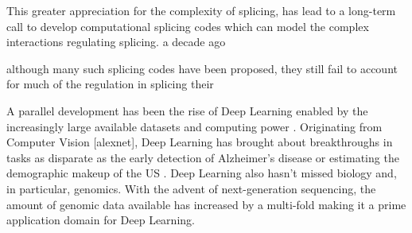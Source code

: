 This greater appreciation for the complexity of splicing, has lead to a long-term call to develop computational splicing codes which can model the complex interactions regulating splicing. 
a decade ago

although many such splicing codes have been proposed, they still fail to account for much of the regulation in splicing their 













A parallel development has been the rise of Deep Learning enabled by the increasingly large available datasets and computing power \cite{deeplearning}. 
Originating from Computer Vision [alexnet], Deep Learning has brought about breakthroughs in tasks as disparate as the early detection of Alzheimer's disease \cite{alzheimerdeeplearning} or estimating the demographic makeup of the US \cite{demographic}. 
Deep Learning also hasn't missed biology and, in particular, genomics. 
With the advent of next-generation sequencing, the amount of genomic data available has increased by a multi-fold making it a prime application domain for Deep Learning. 

